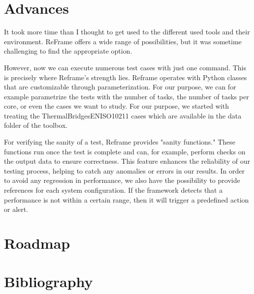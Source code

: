 \documentclass[12pt]{article}
\begin{document}
\newpage
\section{Advances}
It took more time than I thought to get used to the different used tools and their environment.
ReFrame offers a wide range of possibilities, but it was sometime challenging to find the appropriate option.

However, now we can execute numerous test cases with just one command. This is precisely where Reframe's strength lies.
Reframe operates with Python classes that are customizable through parameterization. For our purpose, we can for example parametrize the tests with 
the number of tasks, the number of tasks per core, or even the cases we want to study.
For our purpose, we started with treating the ThermalBridgesENISO10211 cases which are available in the data folder of the toolbox.

For verifying the sanity of a test, Reframe provides "sanity functions." These functions run once the test is complete and can, for example, perform checks on the output data to ensure correctness. 
This feature enhances the reliability of our testing process, helping to catch any anomalies or errors in our results.
In order to avoid any regression in performance, we also have the possibility to provide references for each system configuration.
If the framework detects that a performance is not within a certain range, then it will trigger a predefined action or alert.
\newpage
\section{Roadmap}


\newpage
\section{Bibliography}
\nocite{*}
\printbibliography[heading=none]
\end{document}
